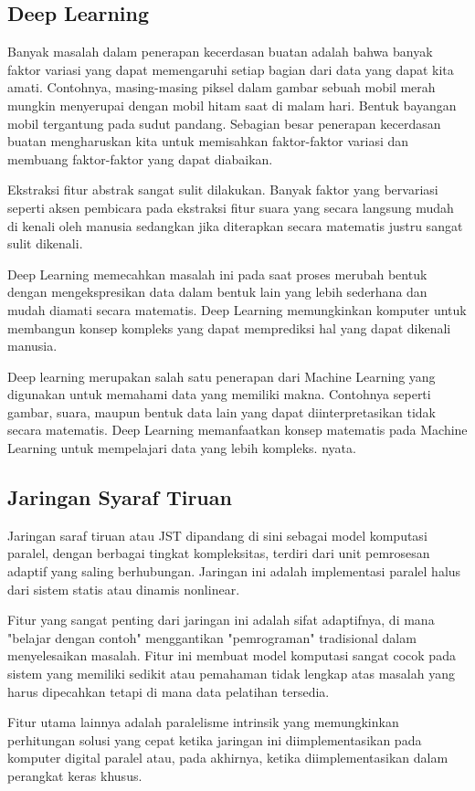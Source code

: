 \documentclass[./skripsi.tex]{subfiles}
\begin{document}
\subsection{Deep Learning}\label{bab2:deeplearning}
\par Banyak masalah dalam penerapan kecerdasan buatan adalah bahwa banyak faktor variasi yang dapat memengaruhi setiap bagian dari data yang dapat kita amati. Contohnya, masing-masing piksel dalam gambar sebuah mobil merah mungkin menyerupai dengan mobil hitam saat di malam hari. Bentuk bayangan mobil tergantung pada sudut pandang. Sebagian besar penerapan kecerdasan buatan mengharuskan kita untuk memisahkan faktor-faktor variasi dan membuang faktor-faktor yang dapat diabaikan.
\par Ekstraksi fitur abstrak sangat sulit dilakukan. Banyak faktor yang bervariasi seperti aksen pembicara pada ekstraksi fitur suara yang secara langsung mudah di kenali oleh manusia sedangkan jika diterapkan secara matematis justru sangat sulit dikenali.
\par Deep Learning memecahkan masalah ini pada saat proses merubah bentuk dengan mengekspresikan data dalam bentuk lain yang lebih sederhana dan mudah diamati secara matematis. Deep Learning memungkinkan komputer untuk membangun konsep kompleks yang dapat memprediksi hal yang dapat dikenali manusia.
\par Deep learning merupakan salah satu penerapan dari Machine Learning yang digunakan untuk memahami data yang memiliki makna. Contohnya seperti gambar, suara, maupun bentuk data lain yang dapat diinterpretasikan tidak secara matematis. Deep Learning memanfaatkan konsep matematis pada Machine Learning untuk mempelajari data yang lebih kompleks. nyata.\cite{goodfellow2016deep}
\subsection{Jaringan Syaraf Tiruan}\label{bab2:jst}
\par Jaringan saraf tiruan atau JST dipandang di sini sebagai model komputasi paralel, dengan berbagai tingkat kompleksitas, terdiri dari unit pemrosesan adaptif yang saling berhubungan. Jaringan ini adalah implementasi paralel halus dari sistem statis atau dinamis nonlinear. 
\par Fitur yang sangat penting dari jaringan ini adalah sifat adaptifnya, di mana "belajar dengan contoh" menggantikan "pemrograman" tradisional dalam menyelesaikan masalah. Fitur ini membuat model komputasi sangat cocok pada sistem yang memiliki sedikit atau pemahaman tidak lengkap atas masalah yang harus dipecahkan tetapi di mana data pelatihan tersedia.
\par Fitur utama lainnya adalah paralelisme intrinsik yang memungkinkan perhitungan solusi yang cepat ketika jaringan ini diimplementasikan pada komputer digital paralel atau, pada akhirnya, ketika diimplementasikan dalam perangkat keras khusus. \cite{hassoun1995fundamentals}
\end{document}
